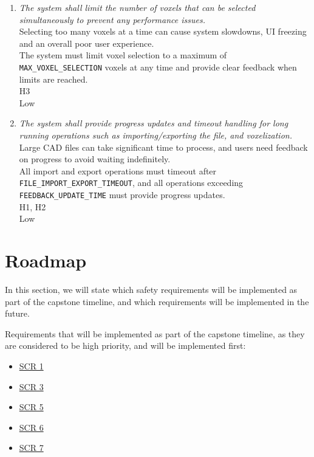 \documentclass{article}
\begin{document}
\begin{enumerate}
\item \hypertarget{scr8}{}\emph{The system shall limit the number of voxels that can be selected simultaneously to prevent any performance issues.}\\
     Selecting too many voxels at a time can cause system slowdowns, UI freezing and an overall poor user experience.\\
     The system must limit voxel selection to a maximum of \texttt{MAX\_VOXEL\_SELECTION} voxels at any time and provide clear feedback when limits are reached.\\
     H3\\
     Low

\item \hypertarget{scr9}{}\emph{The system shall provide progress updates and timeout handling for long running operations such as importing/exporting the file, and voxelization.}\\
     Large CAD files can take significant time to process, and users need feedback on progress to avoid waiting indefinitely.\\
     All import and export operations must timeout after \texttt{FILE\_IMPORT\_EXPORT\_TIMEOUT}, and all operations exceeding \texttt{FEEDBACK\_UPDATE\_TIME} must provide progress updates.\\
     H1, H2\\
     Low

\end{enumerate}

\section{Roadmap}

In this section, we will state which safety requirements will be implemented as part of the capstone timeline, and which requirements will be implemented in the future.

Requirements that will be implemented as part of the capstone timeline, as they are considered to be high priority, and will be implemented first:
\begin{itemize}
    \item \hyperlink{scr1}{SCR 1}
    \item \hyperlink{scr3}{SCR 3}
    \item \hyperlink{scr5}{SCR 5}
    \item \hyperlink{scr6}{SCR 6}
    \item \hyperlink{scr7}{SCR 7}
\end{itemize}
\end{document}
